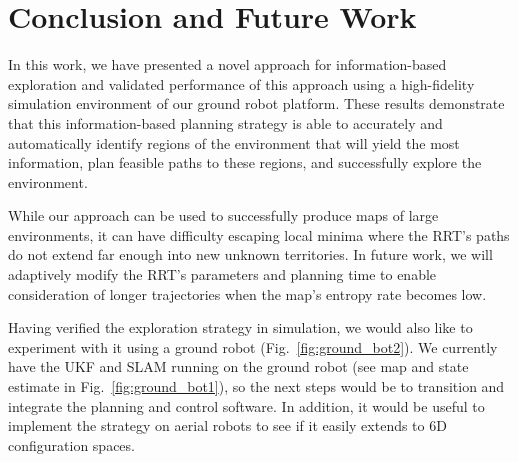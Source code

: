 \section{Conclusion and Future Work}
\label{sec:conclusion}

In this work, we have presented a novel approach for information-based exploration and validated performance of this approach using a high-fidelity simulation environment of our ground robot platform. These results demonstrate that this information-based planning strategy is able to accurately and automatically identify regions of the environment that will yield the most information, plan feasible paths to these regions, and successfully explore the environment.

While our approach can be used to successfully produce maps of large environments, it can have difficulty escaping local minima where the RRT's paths do not extend far enough into new unknown territories. In future work, we will adaptively modify the RRT's parameters and planning time to enable consideration of longer trajectories when the map's entropy rate becomes low.

Having verified the exploration strategy in simulation, we would also like to experiment with it using a ground robot (Fig.~\ref{fig:ground_bot2}). We currently have the UKF and SLAM running on the ground robot (see map and state estimate in Fig.~\ref{fig:ground_bot1}), so the next steps would be to transition and integrate the planning and control software. In addition, it would be useful to implement the strategy on aerial robots to see if it easily extends to 6D configuration spaces. 

